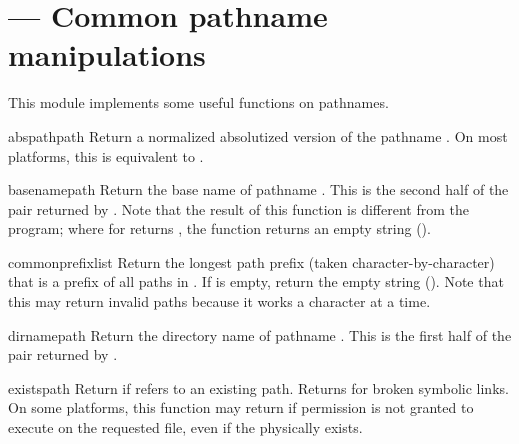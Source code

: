 \section{ ---
         Common pathname manipulations}


This module implements some useful functions on pathnames.



\begin{funcdesc}{abspath}{path}
Return a normalized absolutized version of the pathname .
On most platforms, this is equivalent to
.
\end{funcdesc}

\begin{funcdesc}{basename}{path}
Return the base name of pathname .  This is the second half
of the pair returned by .  Note that the
result of this function is different from the
\UNIX{}  program; where  for
 returns , the 
function returns an empty string ().
\end{funcdesc}

\begin{funcdesc}{commonprefix}{list}
Return the longest path prefix (taken character-by-character) that is a
prefix of all paths in 
.  If  is empty, return the empty string
().  Note that this may return invalid paths because it works a
character at a time.
\end{funcdesc}

\begin{funcdesc}{dirname}{path}
Return the directory name of pathname .  This is the first
half of the pair returned by .
\end{funcdesc}

\begin{funcdesc}{exists}{path}
Return  if  refers to an existing path.  Returns
 for broken symbolic links. On some platforms, this
function may return  if permission is not granted to
execute  on the requested file, even if the
 physically exists.
\end{funcdesc}


